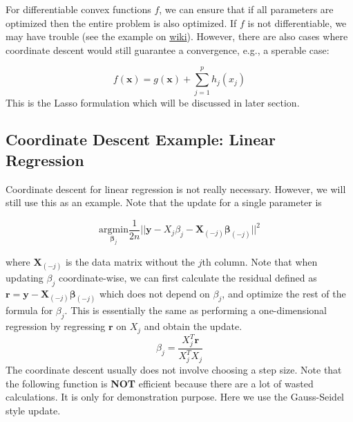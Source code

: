 \documentclass[
]{book}
\theoremstyle{definition}
\theoremstyle{definition}
\theoremstyle{definition}
\theoremstyle{definition}
\theoremstyle{remark}
\begin{document}
For differentiable convex functions \(f\), we can ensure that if all parameters are optimized then the entire problem is also optimized. If \(f\) is not differentiable, we may have trouble (see the example on \href{https://en.wikipedia.org/wiki/Coordinate_descent}{wiki}). However, there are also cases where coordinate descent would still guarantee a convergence, e.g., a sperable case:

\[f(\mathbf{x}) = g(\mathbf{x}) + \sum_{j=1}^p h_j(x_j)\]
This is the Lasso formulation which will be discussed in later section.

\hypertarget{coordinate-descent-example-linear-regression}{%
\subsection{Coordinate Descent Example: Linear Regression}\label{coordinate-descent-example-linear-regression}}

Coordinate descent for linear regression is not really necessary. However, we will still use this as an example. Note that the update for a single parameter is

\[
\underset{\boldsymbol \beta_j}{\text{argmin}} \frac{1}{2n} ||\mathbf{y}- X_j \beta_j - \mathbf{X}_{(-j)} \boldsymbol \beta_{(-j)} ||^2
\]

where \(\mathbf{X}_{(-j)}\) is the data matrix without the \(j\)th column. Note that when updating \(\beta_j\) coordinate-wise, we can first calculate the residual defined as \(\mathbf{r} = \mathbf{y} - \mathbf{X}_{(-j)} \boldsymbol \beta_{(-j)}\) which does not depend on \(\beta_j\), and optimize the rest of the formula for \(\beta_j\). This is essentially the same as performing a one-dimensional regression by regressing \(\mathbf{r}\) on \(X_j\) and obtain the update.
\[
\beta_j = \frac{X_j^T \mathbf{r}}{X_j^T X_j}
\]
The coordinate descent usually does not involve choosing a step size. Note that the following function is \textbf{NOT} efficient because there are a lot of wasted calculations. It is only for demonstration purpose. Here we use the Gauss-Seidel style update.
\end{document}
